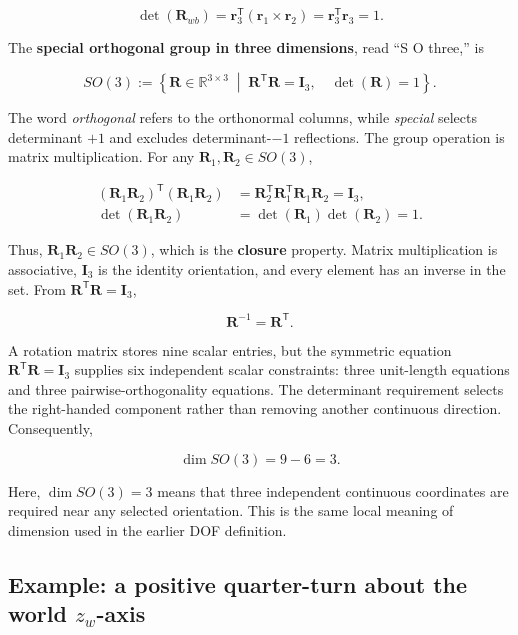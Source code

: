 \documentclass[
  australian,
  12pt,
  letterpaper,
  DIV=11,
  numbers=noendperiod,
  twoside]{scrreprt}
\begin{document}
\[
\det(\mathbf R_{wb})
=
\mathbf r_3^\mathsf T
\left(
\mathbf r_1\times\mathbf r_2
\right)
=
\mathbf r_3^\mathsf T\mathbf r_3
=
1.
\]

The \textbf{special orthogonal group in three dimensions}, read ``S O
three,'' is

\[
\boxed{
SO(3)
\mathrel{:=}
\left\{
\mathbf R\in\mathbb R^{3\times3}
\;\middle|\;
\mathbf R^\mathsf T\mathbf R=\mathbf I_3,
\quad
\det(\mathbf R)=1
\right\}
}.
\]

The word \emph{orthogonal} refers to the orthonormal columns, while
\emph{special} selects determinant \(+1\) and excludes
determinant-\(-1\) reflections. The group operation is matrix
multiplication. For any \(\mathbf R_1,\mathbf R_2\in SO(3)\),

\[
\begin{aligned}
\left(\mathbf R_1\mathbf R_2\right)^\mathsf T
\left(\mathbf R_1\mathbf R_2\right)
&=
\mathbf R_2^\mathsf T
\mathbf R_1^\mathsf T
\mathbf R_1
\mathbf R_2
=
\mathbf I_3,\\
\det\left(\mathbf R_1\mathbf R_2\right)
&=
\det(\mathbf R_1)\det(\mathbf R_2)
=
1.
\end{aligned}
\]

Thus, \(\mathbf R_1\mathbf R_2\in SO(3)\), which is the \textbf{closure}
property. Matrix multiplication is associative, \(\mathbf I_3\) is the
identity orientation, and every element has an inverse in the set. From
\(\mathbf R^\mathsf T\mathbf R=\mathbf I_3\),

\[
\boxed{
\mathbf R^{-1}
=
\mathbf R^\mathsf T
}.
\]

A rotation matrix stores nine scalar entries, but the symmetric equation
\(\mathbf R^\mathsf T\mathbf R=\mathbf I_3\) supplies six independent
scalar constraints: three unit-length equations and three
pairwise-orthogonality equations. The determinant requirement selects
the right-handed component rather than removing another continuous
direction. Consequently,

\[
\boxed{
\dim SO(3)
=
9-6
=
3
}.
\]

Here, \(\dim SO(3)=3\) means that three independent continuous
coordinates are required near any selected orientation. This is the same
local meaning of dimension used in the earlier DOF definition.

\subsection{\texorpdfstring{Example: a positive quarter-turn about the
world
\(z_w\)-axis}{Example: a positive quarter-turn about the world z\_w-axis}}\label{example-a-positive-quarter-turn-about-the-world-z_w-axis}
\end{document}
